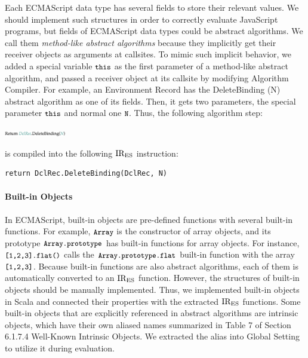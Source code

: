 Each ECMAScript data type has several fields to store their relevant values.
We should implement such structures in order to correctly evaluate JavaScript
programs, but fields of ECMAScript data types could be abstract algorithms.
We call them \textit{method-like abstract algorithms} because they
implicitly get their receiver objects as arguments at callsites.
To mimic such implicit behavior, we added a special variable
\( \code{this} \) as the first parameter of a method-like abstract algorithm,
and passed a receiver object at its callsite by modifying
\textsf{Algorithm Compiler}.  For example, an Environment Record has
the \textsf{DeleteBinding (N)} abstract algorithm as one of its fields.
Then, it gets two parameters, the special parameter \( \code{this} \)
and normal one \( \code{N} \).  Thus, the following algorithm step:
\begin{center}
  \includegraphics[width=0.2\textwidth]{img/method-like-example.png}
\end{center}
is compiled into the following \( \text{IR}_\text{ES} \) instruction:
\begin{lstlisting}[style=ires]
return DclRec.DeleteBinding(DclRec, N)
\end{lstlisting}

\vspace*{-1em}
\paragraph{Built-in Objects}
In ECMAScript, built-in objects are pre-defined functions with several
built-in functions.  For example, \( \code{Array} \)
is the constructor of array objects, and its prototype
\( \code{Array.prototype} \) has built-in functions for array objects.
For instance, \( \code{[1,2,3].flat()} \) calls the
\( \code{Array.prototype.flat} \) built-in function with the array
\( \code{[1,2,3]} \).  Because built-in functions are also abstract
algorithms, each of them is automatically converted to an \( \text{IR}_\text{ES} \)
function.  However, the structures of built-in objects should be
manually implemented.  Thus, we implemented built-in objects in Scala
and connected their properties with the extracted \( \text{IR}_\text{ES} \) functions.
%
Some built-in objects that are explicitly referenced in abstract
algorithms are intrinsic objects, which have their own
aliased names summarized in Table 7 of Section 6.1.7.4
\textsf{Well-Known Intrinsic Objects}.  We extracted the alias
into \textsf{Global Setting} to utilize it during evaluation.
